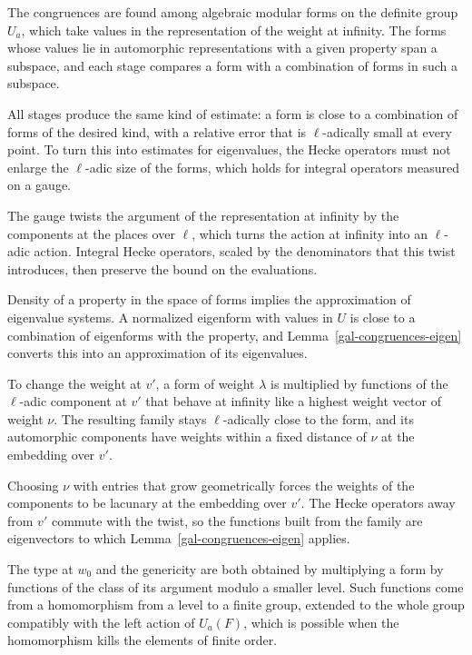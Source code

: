 The congruences are found among algebraic modular forms on the definite group $U_a$, which take values in
the representation of the weight at infinity. The forms whose values lie in automorphic representations
with a given property span a subspace, and each stage compares a form with a combination of forms in such a
subspace.

All stages produce the same kind of estimate: a form is close to a combination of forms of the desired
kind, with a relative error that is $\ell$-adically small at every point. To turn this into estimates for
eigenvalues, the Hecke operators must not enlarge the $\ell$-adic size of the forms, which holds for
integral operators measured on a gauge.

The gauge twists the argument of the representation at infinity by the components at the places over
$\ell$, which turns the action at infinity into an $\ell$-adic action. Integral Hecke operators, scaled by
the denominators that this twist introduces, then preserve the bound on the evaluations.

Density of a property in the space of forms implies the approximation of eigenvalue systems. A normalized
eigenform with values in $U$ is close to a combination of eigenforms with the property, and
Lemma~\ref{gal-congruences-eigen} converts this into an approximation of its eigenvalues.

To change the weight at $v'$, a form of weight $\lambda$ is multiplied by functions of the $\ell$-adic
component at $v'$ that behave at infinity like a highest weight vector of weight $\nu$. The resulting family
stays $\ell$-adically close to the form, and its automorphic components have weights within a fixed
distance of $\nu$ at the embedding over $v'$.

Choosing $\nu$ with entries that grow geometrically forces the weights of the components to be lacunary at
the embedding over $v'$. The Hecke operators away from $v'$ commute with the twist, so the functions built
from the family are eigenvectors to which Lemma~\ref{gal-congruences-eigen} applies.

The type at $w_0$ and the genericity are both obtained by multiplying a form by functions of the class of
its argument modulo a smaller level. Such functions come from a homomorphism from a level to a finite group,
extended to the whole group compatibly with the left action of $U_a(F)$, which is possible when the
homomorphism kills the elements of finite order.


